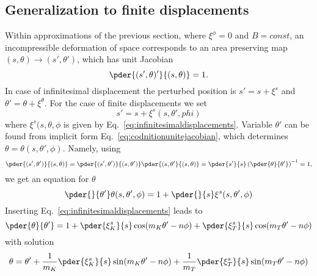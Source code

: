 \subsection{Generalization to finite displacements}
Within approximations of the previous section, where $\xi^{\phi} = 0$
and $B = const$, an incompressible deformation of space corresponds to
an area preserving map $(s, \theta) \rightarrow (s', \theta')$, which
has unit Jacobian
\begin{equation}
  \pder{(s', \theta)'}{(s, \theta)} = 1.
  \label{eq:codnitionunitejacobian}
\end{equation}
In case of infinitesimal displacement the perturbed position is
$s' = s + \xi^{s}$ and $\theta' = \theta + \xi^{\theta}$. For the case
of finite displacements we set
\begin{equation}
  s' = s + \xi^{s}(s, \theta', phi)
\end{equation}
where $\xi^{s}(s, \theta, \phi$ is given by
Eq.~\eqref{eq:infinitesimaldisplacements}. Variable $\theta'$ can be
found from implicit form Eq.~\eqref{eq:codnitionunitejacobian}, which
determines $\theta = \theta(s, \theta', \phi)$.
Namely, using
\begin{equation}
  \pder{(s', \theta')}{(s,\theta)} = \pder{(s',\theta')}{(s, \theta')} \pder{(s, \theta'}{(s, \theta)}
  = \pder{s'}{s} \left( \pder{\theta}{\theta'} \right)^{-1} = 1,
\end{equation}
we get an equation for $\theta$
\begin{equation}
  \pder{}{\theta'} \theta(s, \theta', \phi) = 1 + \pder{}{s} \xi^{s} (s, \theta', \phi)
\end{equation}
Inserting Eq.~\eqref{eq:infinitesimaldisplacements} leads to
\begin{equation}
  \pder{\theta}{\theta'} = 1 + \pder{\xi_K^{s}}{s}\cos(m_K \theta' - n \phi)
                             + \pder{\xi_T^{s}}{s}\cos(m_T \theta' - n \phi)
\end{equation}
with solution
\begin{equation}
  \theta = \theta' + \frac{1}{m_K} \pder{\xi_K^{s}}{s}\sin(m_K \theta' - n \phi)
                   + \frac{1}{m_T} \pder{\xi_T^{s}}{s}\sin(m_T \theta' - n \phi)
\end{equation}
